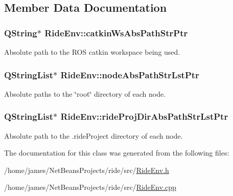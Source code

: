 \subsection{Member Data Documentation}
\hypertarget{class_ride_env_a3f048e5d036e957c7776f1e31c648b41}{
\subsubsection[{catkin\-Ws\-Abs\-Path\-Str\-Ptr}]{\setlength{\rightskip}{0pt plus 5cm}Q\-String$\ast$ Ride\-Env\-::catkin\-Ws\-Abs\-Path\-Str\-Ptr\hspace{0.3cm}{\ttfamily [private]}}}\label{class_ride_env_a3f048e5d036e957c7776f1e31c648b41}
Absolute path to the R\-O\-S catkin workspace being used. \hypertarget{class_ride_env_a5f1bb71c6e9524f2ce403e6b1dd32244}{
\subsubsection[{node\-Abs\-Path\-Str\-Lst\-Ptr}]{\setlength{\rightskip}{0pt plus 5cm}Q\-String\-List$\ast$ Ride\-Env\-::node\-Abs\-Path\-Str\-Lst\-Ptr\hspace{0.3cm}{\ttfamily [private]}}}\label{class_ride_env_a5f1bb71c6e9524f2ce403e6b1dd32244}
Absolute paths to the \char`\"{}root\char`\"{} directory of each node. \hypertarget{class_ride_env_af17923c8161a2456aa4a0d02e6418a4c}{
\subsubsection[{ride\-Proj\-Dir\-Abs\-Path\-Str\-Lst\-Ptr}]{\setlength{\rightskip}{0pt plus 5cm}Q\-String\-List$\ast$ Ride\-Env\-::ride\-Proj\-Dir\-Abs\-Path\-Str\-Lst\-Ptr\hspace{0.3cm}{\ttfamily [private]}}}\label{class_ride_env_af17923c8161a2456aa4a0d02e6418a4c}
Absolute path to the .ride\-Project directory of each node. 

The documentation for this class was generated from the following files\-:\begin{DoxyCompactItemize}
\item 
/home/james/\-Net\-Beans\-Projects/ride/src/\hyperlink{_ride_env_8h}{Ride\-Env.\-h}\item 
/home/james/\-Net\-Beans\-Projects/ride/src/\hyperlink{_ride_env_8cpp}{Ride\-Env.\-cpp}\end{DoxyCompactItemize}
